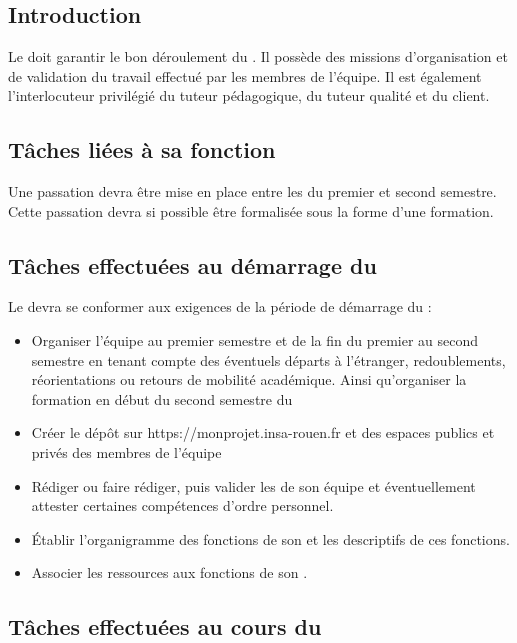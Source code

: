 \section{\CP}
\subsection*{Introduction}

Le \CP{} doit garantir le bon déroulement du \PICCourt. Il possède des missions d’organisation et de validation du travail effectué par les membres de l’équipe. Il est également l’interlocuteur privilégié du tuteur pédagogique, du tuteur qualité et du client.

\subsection*{Tâches liées à sa fonction}

Une passation devra être mise en place entre les \CPs{} du premier et second semestre. Cette passation devra si possible être formalisée sous la forme d’une formation.

\subsection*{Tâches effectuées au démarrage du \PICCourt}

Le \CP{} devra se conformer aux exigences de la période de démarrage du \PICCourt :
\begin{itemize}
	\item Organiser l’équipe \PICCourt au premier semestre et de la fin du premier au second semestre en tenant compte des éventuels départs à l’étranger, redoublements, réorientations ou retours de mobilité académique. Ainsi qu’organiser la formation en début du second semestre du \PICCourt
	\item Créer le dépôt \git{} sur https://monprojet.insa-rouen.fr et des espaces publics et privés des membres de l’équipe \PICCourt
	\item Rédiger ou faire rédiger, puis valider les \FC{} de son équipe et éventuellement attester certaines compétences d’ordre personnel.
	\item Établir l’organigramme des fonctions de son \PICCourt et les descriptifs de ces fonctions.
	\item Associer les ressources aux fonctions de son \PICCourt.
\end{itemize}

\subsection*{Tâches effectuées au cours du \PICCourt}

